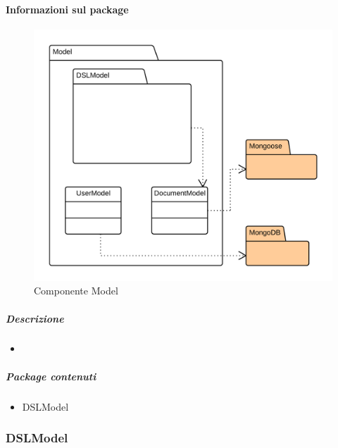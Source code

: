   \paragraph{Informazioni sul package} 
    \begin{figure}[H] 
      \begin{center} 
        \includegraphics[width=\textwidth]{uml/package/Back-end::Lib::Model.png}  
        \caption{Componente Model}
      \end{center}  
    \end{figure} 
  \subparagraph{Descrizione} 
    \begin{itemize}
    \item[] 
    \end{itemize} 
    \subparagraph{Package contenuti} 
    \begin{itemize}
        \item DSLModel
    \end{itemize}
  \subsubsection{DSLModel}
